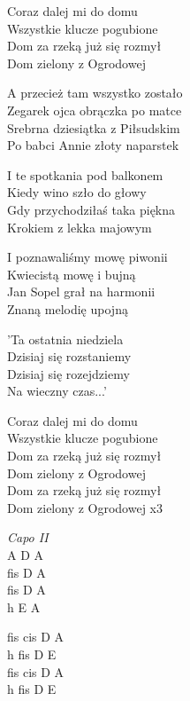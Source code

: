 \begin{text}
    \chordfill
    Coraz dalej mi do domu\\
    Wszystkie klucze pogubione\\
    Dom za rzeką już się rozmył\\
    Dom zielony z Ogrodowej

    A przecież tam wszystko zostało\\
    Zegarek ojca obrączka po matce\\
    Srebrna dziesiątka z Piłsudskim\\
    Po babci Annie złoty naparstek

    I te spotkania pod balkonem\\
    Kiedy wino szło do głowy\\
    Gdy przychodziłaś taka piękna\\
    Krokiem z lekka majowym

    I poznawaliśmy mowę piwonii\\
    Kwiecistą mowę i bujną\\
    Jan Sopel grał na harmonii\\
    Znaną melodię upojną

    'Ta ostatnia niedziela\\
    Dzisiaj się rozstaniemy\\
    Dzisiaj się rozejdziemy\\
    Na wieczny czas...'

    Coraz dalej mi do domu\\
    Wszystkie klucze pogubione\\
    Dom za rzeką już się rozmył\\
    Dom zielony z Ogrodowej\\
    Dom za rzeką już się rozmył\\
    Dom zielony z Ogrodowej x3
\end{text}
\begin{chord}
    \textit{Capo II}\\
    A D A\\
    fis D A\\
    fis D A\\
    h E A

    fis cis D A\\
    h fis D E\\
    fis cis D A\\
    h fis D E
\end{chord}